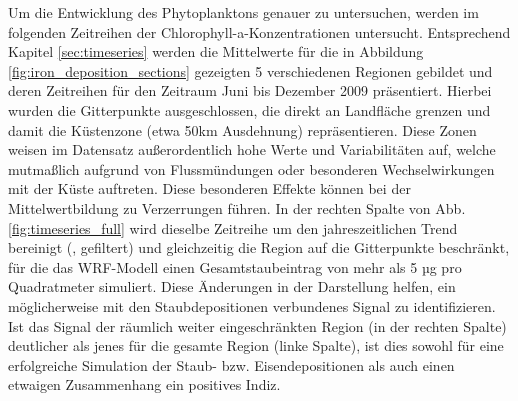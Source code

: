 \documentclass[12pt,a4paper,onecolumn]{scrartcl}
\begin{document}
Um die Entwicklung des Phytoplanktons genauer zu untersuchen, werden im folgenden Zeitreihen der Chlorophyll-a-Konzentrationen untersucht. Entsprechend Kapitel \ref{sec:timeseries} werden die Mittelwerte für die in Abbildung \ref{fig:iron_deposition_sections} gezeigten 5 verschiedenen Regionen gebildet und deren Zeitreihen für den Zeitraum Juni bis Dezember 2009 präsentiert. Hierbei wurden die Gitterpunkte ausgeschlossen, die direkt an Landfläche grenzen und damit die Küstenzone (etwa 50km Ausdehnung) repräsentieren. Diese Zonen weisen im Datensatz außerordentlich hohe Werte und Variabilitäten auf, welche mutmaßlich aufgrund von Flussmündungen oder besonderen Wechselwirkungen mit der Küste auftreten. Diese besonderen Effekte können bei der Mittelwertbildung zu Verzerrungen führen. In der rechten Spalte von Abb. \ref{fig:timeseries_full} wird dieselbe Zeitreihe um den jahreszeitlichen Trend bereinigt (, gefiltert) und gleichzeitig die Region auf die Gitterpunkte beschränkt, für die das WRF-Modell einen Gesamtstaubeintrag von mehr als 5 µg pro Quadratmeter simuliert. Diese Änderungen in der Darstellung helfen, ein möglicherweise mit den Staubdepositionen verbundenes Signal zu identifizieren. Ist das Signal der räumlich weiter eingeschränkten Region (in der rechten Spalte) deutlicher als jenes für die gesamte Region (linke Spalte), ist dies sowohl für eine erfolgreiche Simulation der Staub- bzw. Eisendepositionen als auch einen etwaigen Zusammenhang ein positives Indiz. 
\end{document}
